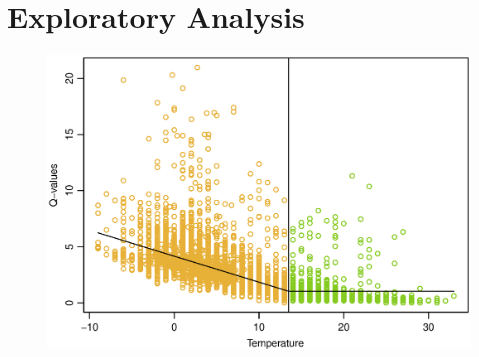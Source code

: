 \chapter{Exploratory Analysis}


\begin{figure}[H]
    \centering \includegraphics[width=1.\textwidth]{../../../figures/Consumption_H1.eps}
    \caption{}
    \label{fig: hej}
\end{figure}